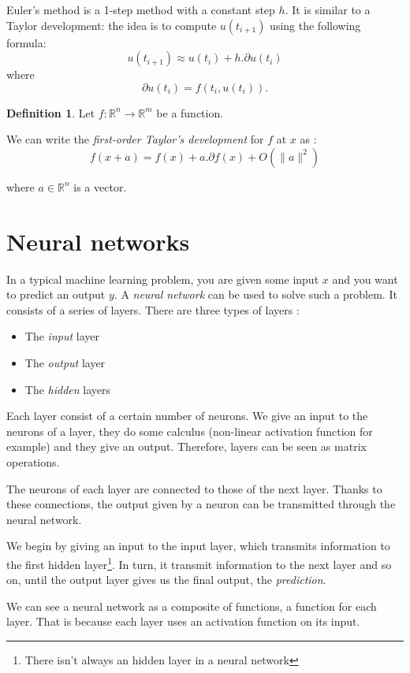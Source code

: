 \documentclass[10pt,a4paper]{article}
\theoremstyle{definition}
\newtheorem{definition}{Definition}
\theoremstyle{definition}
\theoremstyle{definition}
\begin{document}
Euler's method is a 1-step method with a constant step $h$. It is similar to a Taylor development: the idea is to compute $u(t_{i+1})$ using the following formula:
$$
u(t_{i+1}) \approx u(t_i) + h . \partial u(t_i)
$$
where 
$$
\partial u(t_i) = f(t_i, u(t_i)).
$$

\begin{definition}
Let $f: \mathbb{R}^n \rightarrow \mathbb{R}^m$ be a function.

We can write the \textit{first-order Taylor's development} for $f$ at $x$ as :
$$
f(x + a) = f(x) + a . \partial f(x) + O(\| a\|^2)
$$

where $a \in \mathbb{R}^n$ is a vector.
\end{definition}

\section{Neural networks}

In a typical machine learning problem, you are given some input $x$ and you want to predict an output $y$. A \textit{neural network} can be used to solve such a problem. It consists of a series of layers. There are three types of layers :

\begin{itemize}
\item The \textit{input} layer
\item The \textit{output} layer
\item The \textit{hidden} layers
\end{itemize}

Each layer consist of a certain number of neurons. We give an input to the neurons of a layer, they do some calculus (non-linear activation function for example) and they give an output. Therefore, layers can be seen as matrix operations. 

The neurons of each layer are connected to those of the next layer. Thanks to these connections, the output given by a neuron can be transmitted through the neural network. 

We begin by giving an input to the input layer, which transmits information to the first hidden layer\footnote{There isn't always an hidden layer in a neural network}. In turn, it transmit information to the next layer and so on, until the output layer gives us the final output, the \textit{prediction}. 

We can see a neural network as a composite of functions, a function for each layer. That is because each layer uses an activation function on its input. 
\end{document}
